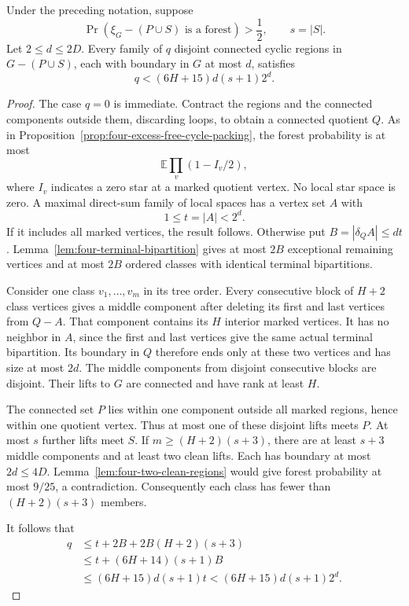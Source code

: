 \begin{proposition}
\label{prop:four-packing-after-deletion}
Under the preceding notation, suppose
\[
 \Pr(\xi_G-(P\cup S)\text{ is a forest})>\frac12,
 \qquad s=|S|.
\]
Let $2\le d\le2D$.
Every family of $q$ disjoint connected cyclic regions in $G-(P\cup S)$, each with boundary in $G$ at most $d$, satisfies
\[
 q<(6H+15)d(s+1)2^d.
\]
\end{proposition}

\begin{proof}
The case $q=0$ is immediate.
Contract the regions and the connected components outside them, discarding loops, to obtain a connected quotient $Q$.
As in Proposition~\ref{prop:four-excess-free-cycle-packing}, the forest probability is at most
\[
 \mathbb E\prod_v(1-I_v/2),
\]
where $I_v$ indicates a zero star at a marked quotient vertex.
No local star space is zero.
A maximal direct-sum family of local spaces has a vertex set $A$ with
\[
 1\le t=|A|<2^d.
\]
If it includes all marked vertices, the result follows.
Otherwise put $B=|\delta_QA|\le dt$.
Lemma~\ref{lem:four-terminal-bipartition} gives at most $2B$ exceptional remaining vertices and at most $2B$ ordered classes with identical terminal bipartitions.

Consider one class $v_1,\ldots,v_m$ in its tree order.
Every consecutive block of $H+2$ class vertices gives a middle component after deleting its first and last vertices from $Q-A$.
That component contains its $H$ interior marked vertices.
It has no neighbor in $A$, since the first and last vertices give the same actual terminal bipartition.
Its boundary in $Q$ therefore ends only at these two vertices and has size at most $2d$.
The middle components from disjoint consecutive blocks are disjoint.
Their lifts to $G$ are connected and have rank at least $H$.

The connected set $P$ lies within one component outside all marked regions, hence within one quotient vertex.
Thus at most one of these disjoint lifts meets $P$.
At most $s$ further lifts meet $S$.
If $m\ge(H+2)(s+3)$, there are at least $s+3$ middle components and at least two clean lifts.
Each has boundary at most $2d\le4D$.
Lemma~\ref{lem:four-two-clean-regions} would give forest probability at most $9/25$, a contradiction.
Consequently each class has fewer than $(H+2)(s+3)$ members.

It follows that
\begin{align*}
 q&\le t+2B+2B(H+2)(s+3)\\
  &\le t+(6H+14)(s+1)B\\
  &\le(6H+15)d(s+1)t
   <(6H+15)d(s+1)2^d.
\end{align*}
\end{proof}

